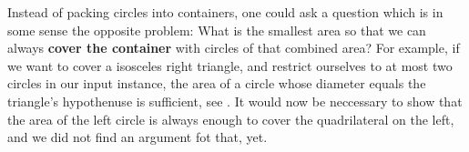 \documentclass[a4paper,style=print,oneside,bibliography=totoc,nexus,lnum,extramargin]{tubsbook}
\begin{document}
Instead of packing circles into containers, one could ask a question which is in some sense the opposite problem: What is the smallest area so that we can always \textbf{cover the container} with circles of that combined area? For example, if we want to cover a isosceles right triangle, and restrict ourselves to at most two circles in our input instance, the area of a circle whose diameter equals the triangle's hypothenuse is sufficient, see . It would now be neccessary to show that the area of the left circle is always enough to cover the quadrilateral on the left, and we did not find an argument fot that, yet.


\printbibliography
\end{document}
